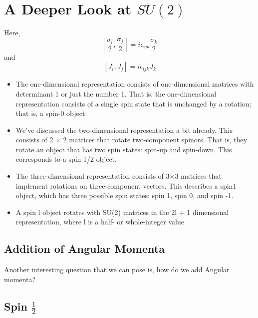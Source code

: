 \documentclass[]{article}
\begin{document}
\section{A Deeper Look at $SU(2)$}
Here,
$$$$
\begin{equation}
\left[\frac{\sigma_{i}}{2}, \frac{\sigma_{j}}{2}\right] = i \epsilon_{ijk}\frac{\sigma_{k}}{2}
\end{equation}
and
\begin{equation}
\left[J_{i}, J_{j}\right] = i \epsilon_{ijk}J_{k}
\end{equation}

\begin{itemize}
\item The one-dimensional representation consists of one-dimensional matrices
with determinant 1 or just the number 1. That is, the one-dimensional
representation consists of a single spin state that is unchanged by a
rotation; that is, a spin-0 object.
\item We’ve discussed the two-dimensional representation a bit already. This
consists of 2 × 2 matrices that rotate two-component spinors. That is,
they rotate an object that has two spin states: spin-up and spin-down.
This corresponds to a spin-1/2 object.
\item The three-dimensional representation consists of 3×3 matrices that implement rotations on three-component vectors. This describes a spin1 object, which has three possible spin states: spin 1, spin 0, and spin -1.
\item A spin l object rotates with SU(2) matrices in the 2l + 1 dimensional representation, where l is a half- or whole-integer value
\end{itemize}
\subsection{Addition of Angular Momenta}
Another interesting question that we can pose is, how do we add Angular momenta? 
\subsection{Spin $\frac{1}{2}$}
\end{document}
